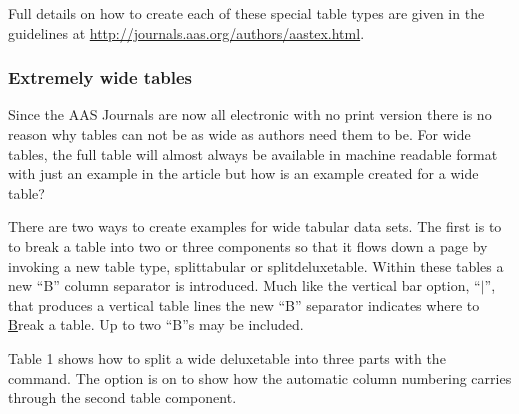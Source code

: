 \documentclass[linenumbers,amsmath,trackchanges]{aastex702}
\begin{document}
Full details on how to create each of these special table types are given in the guidelines at \url{http://journals.aas.org/authors/aastex.html}.

\subsubsection{Extremely wide tables}

Since the AAS Journals are now all electronic with no print version there is no reason why tables can not be as wide as authors need them to be. For wide tables, the full table will almost always be available in machine readable format with just an example in the article but how is an example created for a wide table?

There are two ways to create examples for wide tabular data sets. The first is to to break a table into two or three components so that it flows down a page by invoking a new table type, splittabular or splitdeluxetable. Within these tables a new ``B'' column separator is introduced.  Much like the vertical bar option, ``$\vert$'', that produces a vertical table lines the new ``B'' separator indicates where to \underline{B}reak a table.  Up to two ``B''s may be included.

Table 1 shows how to split a wide deluxetable into three parts with
the {\tt\string\splitdeluxetable} command.  The {\tt\string\colnumbers}
option is on to show how the automatic column numbering carries through the
second table component.
\end{document}
